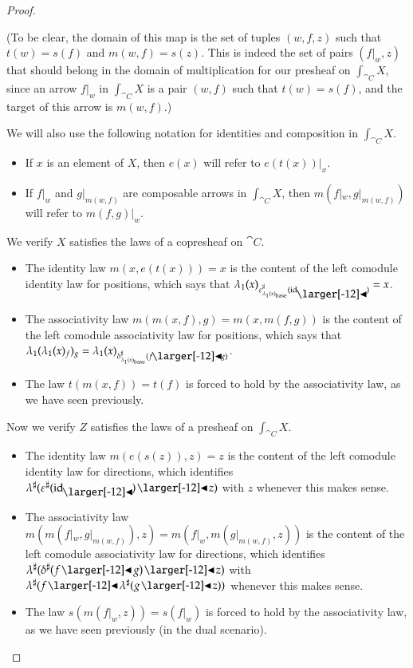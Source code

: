 \documentclass{amsart}
\begin{document}
\begin{proof}
\begin{itemize}
    (To be clear, the domain of this map is the set of tuples
    $(w, f, z)$ such that $t(w) = s(f)$ and $m(w, f) = s(z)$. This is
    indeed the set of pairs $(f|_w, z)$ that should belong in the
    domain of multiplication for our presheaf on $\int_{\cat{C}}X$,
    since an arrow $f|_w$ in $\int_{\cat{C}}X$ is a pair $(w, f)$ such
    that $t(w) = s(f)$, and the target of this arrow is $m(w, f)$.)
  \end{itemize}

  We will also use the following notation for identities and
  composition in $\int_{\cat{C}}X$.
  \begin{itemize}
  \item If $x$ is an element of $X$, then $e(x)$ will refer to
    $e(t(x))|_x$.
  \item If $f|_w$ and $g|_{m(w,f)}$ are composable arrows in
    $\int_{\cat{C}}X$, then $m(f|_w, g|_{m(w,f)})$ will refer to
    $m(f, g)|_w$.
  \end{itemize}

  We verify $X$ satisfies the laws of a copresheaf on $\cat{C}$.
  \begin{itemize}
  \item The identity law $m(x, e(t(x))) = x$ is the content of the left
    comodule identity law for positions, which says that
    $\posmapof{\lambda}{x}_{\dirmapof{\varepsilon}{\posmapof{\lambda}{x}_\base}{\idsubd}} = x$.
  \item The associativity law $m(m(x, f), g) = m(x, m(f, g))$ is the
    content of the left comodule associativity law for positions,
    which says that
    $\posmapof{\lambda}{\posmapof{\lambda}{x}_f}_g =
    \posmapof{\lambda}{x}_{\dirmapof{\delta}{\posmapof{\lambda}{x}_\base}{f
        \subd g}}$.
  \item The law $t(m(x, f)) = t(f)$ is forced to hold by the
    associativity law, as we have seen previously.
  \end{itemize}
  
  Now we verify $Z$ satisfies the laws of a presheaf on $\int_{\cat{C}}X$.
  \begin{itemize}
  \item The identity law $m(e(s(z)), z) = z$ is the content of the left
    comodule identity law for directions, which identifies
    ${\anydirmapof{\lambda}{\anydirmapof{\varepsilon}{\idsubd} \subd z}}$
    with $z$ whenever this makes sense.
  \item The associativity law
    $m(m(f|_w, g|_{m(w,f)}), z) = m(f|_w, m(g|_{m(w,f)}, z))$ is the
    content of the left comodule associativity law for
    directions, which identifies
    ${\anydirmapof{\lambda}{\anydirmapof{\delta}{f \subd g} \subd z}}$
    with
    ${\anydirmapof{\lambda}{f \subd \anydirmapof{\lambda}{g \subd z}}}$
    whenever this makes sense.
  \item The law $s(m(f|_w, z)) = s(f|_w)$ is forced to hold by the
    associativity law, as we have seen previously (in the dual
    scenario).
  \end{itemize}


\end{proof}
\end{document}
